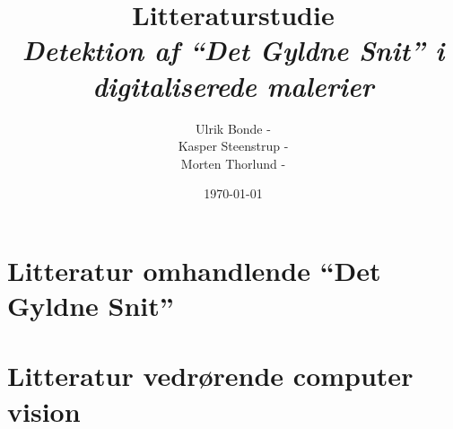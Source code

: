 \documentclass[a4paper, 10pt, danish, final]{article}
\title{Litteraturstudie\\{\Large \emph{Detektion af ``Det Gyldne Snit'' i digitaliserede malerier}}}
\author{Ulrik Bonde - \mailto{bonde@diku.dk}\\
Kasper Steenstrup - \mailto{khsj@diku.dk}\\
Morten Thorlund - \mailto{thorlund@diku.dk}}
\date{\today}
\begin{document}
\maketitle
\thispagestyle{empty}



\section*{Litteratur omhandlende ``Det Gyldne Snit''}


\section*{Litteratur vedrørende computer vision}







%
\end{document}
